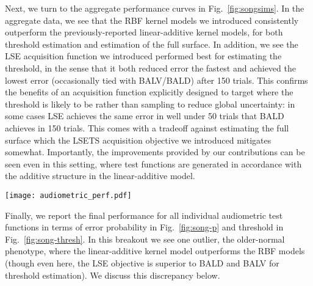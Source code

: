 \documentclass[../main.tex]{subfiles}
\begin{document}
Next, we turn to the aggregate performance curves in Fig.~\ref{fig:songsims}. In the aggregate data, we see that the RBF kernel models we introduced consistently outperform the previously-reported linear-additive kernel models, for both threshold estimation and estimation of the full surface. In addition, we see the LSE acquisition function we introduced performed best for estimating the threshold, in the sense that it both reduced error the fastest and achieved the lowest error (occasionally tied with BALV/BALD) after 150 trials. This confirms the benefits of an acquisition function explicitly designed to target where the threshold is likely to be rather than sampling to reduce global uncertainty: in some cases LSE achieves the same error in well under 50 trials that BALD achieves in 150 trials. This comes with a tradeoff against estimating the full surface which the LSETS acquisition objective we introduced mitigates somewhat. Importantly, the improvements provided by our contributions can be seen even in this setting, where test functions are generated in accordance with the additive structure in the linear-additive model.

\begin{figure*}[!htb]
    \centering
    \texttt{[image: audiometric\_perf.pdf]}
    \caption{\textbf{Audiometric test function performance}. \emph{Left}: For threshold estimation, LSE consistently the best objective, consistent with its explicit targeting of putative threshold locations, independent of model. \emph{Right}: For estimating the full posterior, BALV appears superior in this setting, followed by all the other objectives excluding LSE, whose focus on the threshold location leads to undersampling of the rest of the surface. In both evaluations, the monotonic and nonmonotonic RBF models are far superior to the linear-additive model, whose average performance is poor overall. Finally, the benefit of monotonicity seems minor at best over the nonmonotonic model. Shaded intervals are a 0.95 confidence interval over simulations. Note the log-scale on the y-axis.}
    \label{fig:songsims}
\end{figure*}

Finally, we report the final performance for all individual audiometric test functions in terms of error probability in Fig.~\ref{fig:song-p} and threshold in Fig.~\ref{fig:song-thresh}. In this breakout we see one outlier, the older-normal phenotype, where the linear-additive kernel model outperforms the RBF models (though even here, the LSE objective is superior to BALD and BALV for threshold estimation). We discuss this discrepancy below.
\end{document}
